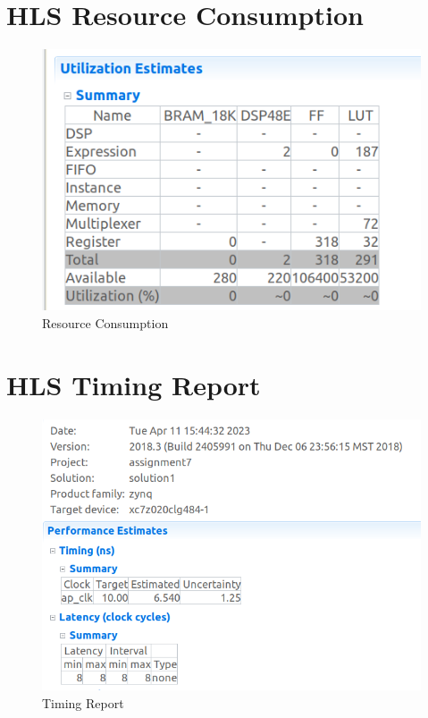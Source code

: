 \documentclass{article}
\begin{document}
\section{HLS Resource Consumption}
\vspace{3cm}
\begin{figure}[h]
    \centering
\includegraphics[width=\columnwidth]{1.png}
    \caption{Resource Consumption}
    \label{fig:my_label}
\end{figure}

\vspace{5cm}


\section{HLS Timing Report}
\vspace{1cm}
\begin{figure}[h]
    \centering
\includegraphics[width=\columnwidth]{figs/2.png}
    \caption{Timing Report}
    \label{fig:my_label}
\end{figure}
\end{document}
